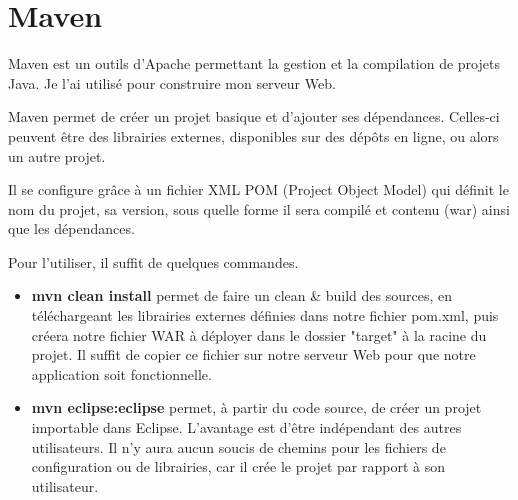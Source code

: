 
\section{Maven}

Maven est un outils d'Apache permettant la gestion et la compilation de projets Java. Je l'ai utilisé pour construire mon serveur Web.

\medskip

Maven permet de créer un projet basique et d'ajouter ses dépendances. Celles-ci peuvent être des librairies externes, disponibles sur des dépôts en ligne, ou alors un autre projet.

Il se configure grâce à un fichier XML POM (Project Object Model) qui définit le nom du projet, sa version, sous quelle forme il sera compilé et contenu (war) ainsi que les dépendances.

\medskip

Pour l'utiliser, il suffit de quelques commandes.

\begin{itemize}
	\item {\bf mvn clean install} permet de faire un clean \& build des sources, en téléchargeant les librairies externes définies dans notre fichier pom.xml, puis créera notre fichier WAR à déployer dans le dossier "target" à la racine du projet. Il suffit de copier ce fichier sur notre serveur Web pour que notre application soit fonctionnelle.
	\item {\bf mvn eclipse:eclipse} permet, à partir du code source, de créer un projet importable dans Eclipse. L'avantage est d'être indépendant des autres utilisateurs. Il n'y aura aucun soucis de chemins pour les fichiers de configuration ou de librairies, car il crée le projet par rapport à son utilisateur.
\end{itemize}